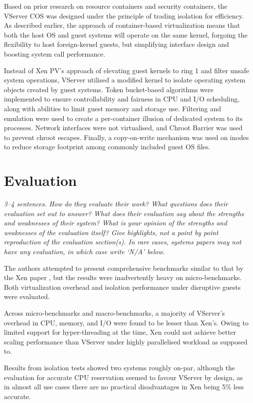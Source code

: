 \documentclass[11pt]{article}
\begin{document}
Based on prior research on resource containers and security containers, the VServer COS was designed under the principle of trading isolation for efficiency. As described earlier, the approach of container-based virtualization means that both the host OS and guest systems will operate on the same kernel, forgoing the flexibility to host foreign-kernel guests, but simplifying interface design and boosting system call performance. 

Instead of Xen PV's approach of elevating guest kernels to ring 1 and filter unsafe system operations, VServer utilised a modified kernel to isolate operating system objects created by guest systems. Token bucket-based algorithms were implemented to ensure controllability and fairness in CPU and I/O scheduling, along with abilities to limit guest memory and storage use. Filtering and emulation were used to create a per-container illusion of dedicated system to its processes. Network interfaces were not virtualised, and Chroot Barrier was used to prevent chroot escapes. Finally, a copy-on-write mechanism was used on inodes to reduce storage footprint among commonly included guest OS files.


\section*{Evaluation}
\textsl{3--4 sentences. How do they evaluate their work? What questions does their evaluation set out to answer? What does their evaluation say about the strengths and weaknesses of their system? What is your opinion of the strengths and weaknesses of the evaluation itself?  Give highlights, not a point by point reproduction of the evaluation section(s). In rare cases, systems papers may not have any evaluation, in which case write `N/A' below.}

The authors attempted to present comprehensive benchmarks similar to that by the Xen paper \cite[Sec. 4]{barham2003xen}, but the results were inadvertently heavy on micro-benchmarks. Both virtualization overhead and isolation performance under disruptive guests were evaluated. 

Across micro-benchmarks and macro-benchmarks, a majority of VServer's overhead in CPU, memory, and I/O were found to be lesser than Xen's. Owing to limited support for hyper-threading at the time, Xen could not achieve better scaling performance than VServer under highly parallelised workload as supposed to. 

Results from isolation tests showed two systems roughly on-par, although the evaluation for accurate CPU reservation seemed to favour VServer by design, as in almost all use cases there are no practical disadvantages in Xen being 5\% less accurate.
\end{document}
